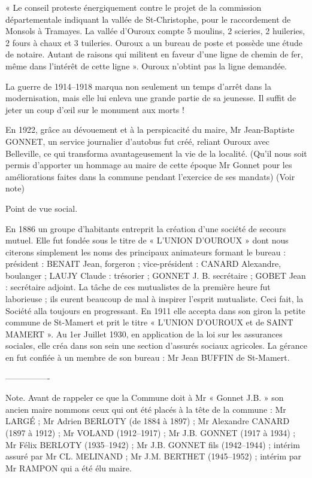 « Le conseil proteste énergiquement contre le projet de la commission départementale indiquant la vallée de St-Christophe, pour le raccordement de Monsols à Tramayes. La vallée d'Ouroux compte 5 moulins, 2 scieries, 2 huileries, 2 fours à chaux et 3 tuileries. Ouroux a un bureau de poste et possède une étude de notaire. Autant de raisons qui militent en faveur d'une ligne de chemin de fer, même dans l'intérêt de cette ligne ». Ouroux n'obtint pas la ligne demandée.

La guerre de 1914--1918 marqua non seulement un temps d'arrêt dans la modernisation, mais elle lui enleva une grande partie de sa jeunesse. Il suffit de jeter un coup d'œil sur le monument aux morts !

En 1922, grâce au dévouement et à la perspicacité du maire, Mr Jean-Baptiste GONNET, un service journalier d'autobus fut créé, reliant Ouroux avec Belleville, ce qui transforma avantageusement la vie de la localité. (Qu'il nous soit permis d'apporter un hommage au maire de cette époque Mr Gonnet pour les améliorations faites dans la commune pendant l'exercice de ses mandats) (Voir note)

Point de vue social.

En 1886 un groupe d'habitants entreprit la création d'une société de secours mutuel. Elle fut fondée sous le titre de « L'UNION D'OUROUX » dont nous citerons simplement les noms des principaux animateurs formant le bureau : président : BENAIT Jean, forgeron ; vice-président : CANARD Alexandre, boulanger ; LAUJY Claude : trésorier ; GONNET J. B. secrétaire ; GOBET Jean : secrétaire adjoint. La tâche de ces mutualistes de la première heure fut laborieuse ; ils eurent beaucoup de mal à inspirer l'esprit mutualiste. Ceci fait, la Société alla toujours en progressant. En 1911 elle accepta dans son giron la petite commune de St-Mamert et prit le titre « L'UNION D'OUROUX et de SAINT MAMERT ». Au 1er Juillet 1930, en application de la loi sur les assurances sociales, elle créa dans son sein une section d'assurés sociaux agricoles. La gérance en fut confiée à un membre de son bureau : Mr Jean BUFFIN de St-Mamert.

----------------

Note. Avant de rappeler ce que la Commune doit à Mr « Gonnet J.B. » son ancien maire nommons ceux qui ont été placés à la tête de la commune : Mr LARGÉ ; Mr Adrien BERLOTY (de 1884 à 1897) ; Mr Alexandre CANARD (1897 à 1912) ; Mr VOLAND (1912--1917) ; Mr J.B. GONNET (1917 à 1934) ; Mr Félix BERLOTY (1935--1942) ; Mr J.B. GONNET fils (1942--1944) ; intérim assuré par Mr CL. MELINAND ; Mr J.M. BERTHET (1945--1952) ; intérim par Mr RAMPON qui a été élu maire.

